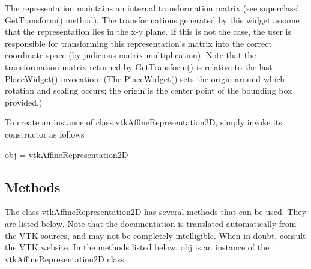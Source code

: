 The representation maintains an internal transformation matrix (see superclass' Get\-Transform() method). The transformations generated by this widget assume that the representation lies in the x-\/y plane. If this is not the case, the user is responsible for transforming this representation's matrix into the correct coordinate space (by judicious matrix multiplication). Note that the transformation matrix returned by Get\-Transform() is relative to the last Place\-Widget() invocation. (The Place\-Widget() sets the origin around which rotation and scaling occurs; the origin is the center point of the bounding box provided.)

To create an instance of class vtk\-Affine\-Representation2\-D, simply invoke its constructor as follows \begin{DoxyVerb}  obj = vtkAffineRepresentation2D
\end{DoxyVerb}
 \hypertarget{vtkwidgets_vtkxyplotwidget_Methods}{}\subsection{Methods}\label{vtkwidgets_vtkxyplotwidget_Methods}
The class vtk\-Affine\-Representation2\-D has several methods that can be used. They are listed below. Note that the documentation is translated automatically from the V\-T\-K sources, and may not be completely intelligible. When in doubt, consult the V\-T\-K website. In the methods listed below, {\ttfamily obj} is an instance of the vtk\-Affine\-Representation2\-D class. 
